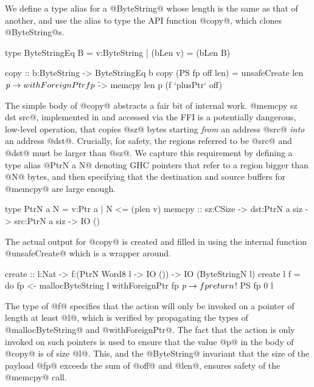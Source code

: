 We define a type alias for a @ByteString@ whose length is the same
as that of another, and use the alias to type the API 
function @copy@, which clones @ByteString@s.

\begin{code}
  type ByteStringEq B = {v:ByteString | (bLen v) = (bLen B)}
  
  copy :: b:ByteString -> ByteStringEq b 
  copy (PS fp off len) 
    = unsafeCreate len $ \mathit{p} -> 
        withForeignPtr fp $ \f ->
          memcpy len p (f `plusPtr` off) 
\end{code}

The simple body of @copy@ abstracts a fair bit of internal work. 
@memcpy sz dst src@, implemented in \C and accessed via the FFI is a potentially
dangerous, low-level operation, that copies @sz@ bytes starting
\emph{from} an address @src@ \emph{into} an address @dst@. 
Crucially, for safety, the regions referred to be @src@ and @dst@ 
must be larger than @sz@. We capture this requirement by defining
a type alias @PtrN a N@ denoting GHC pointers that refer to a region
bigger than @N@ bytes, and then specifying that the destination
and source buffers for @memcpy@ are large enough. 

\begin{code}
  type PtrN a N = {v:Ptr a | N <= (plen v)}
  memcpy :: sz:CSize -> dst:PtrN a siz 
                     -> src:PtrN a siz 
                     -> IO () 
\end{code}


The actual output for @copy@ is created and filled in using the 
internal function @unsafeCreate@ which is a wrapper around. 
\begin{code}
  create :: l:Nat -> f:(PtrN Word8 l -> IO ())
         -> IO (ByteStringN l)
  create l f = do
      fp <- mallocByteString l
      withForeignPtr fp $ \mathit{p} -> f p
      return $! PS fp 0 l
\end{code}

%
The type of @f@ specifies that the action
will only be invoked on a pointer of length at least 
@l@, which is verified by propagating the types of
@mallocByteString@ and @withForeignPtr@. 
%
The fact that the action is only invoked on such pointers 
is used to ensure that the value @p@ in the body of @copy@ 
is of size @l@. This, and the @ByteString@ 
invariant that the size of the payload @fp@ 
exceeds the sum of @off@ and @len@, ensures 
safety of the @memcpy@ call.

